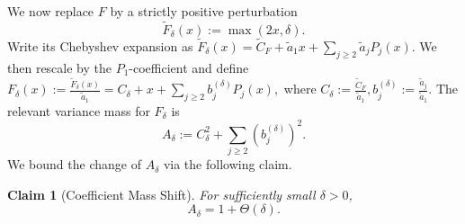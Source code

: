 \documentclass[12pt]{article}
\newtheorem{claim}[theorem]{Claim}
\begin{document}
We now replace \(F\) by a strictly positive perturbation
\[
    \widetilde F_\delta(x):=\max(2x,\delta).
\]
Write its Chebyshev expansion as
\(
    \widetilde F_\delta(x)
    =
    \widetilde C_F+\widetilde a_1x+\sum_{j\ge2}\widetilde a_jP_j(x).
\)
We then rescale by the \(P_1\)-coefficient and define
\(
    F_\delta(x)
    :=
    \frac{\widetilde F_\delta(x)}{\widetilde a_1}
    =
    C_\delta+x+\sum_{j\ge2}b_j^{(\delta)}P_j(x),
\)
where
\(
    C_\delta:=\frac{\widetilde C_F}{\widetilde a_1},
       b_j^{(\delta)}:=\frac{\widetilde a_j}{\widetilde a_1}.
\)
The relevant variance mass for \(F_\delta\) is
\[
    A_\delta
    :=
    C_\delta^2+\sum_{j\ge2}(b_j^{(\delta)})^2.
\]
We bound the change of $A_\delta$ via the following claim.
\begin{claim}[Coefficient Mass Shift]
\label{claim:A-delta-shift}
For sufficiently small \(\delta>0\),
\[
    A_\delta=1+\Theta(\delta).
\]
\end{claim}
\end{document}
